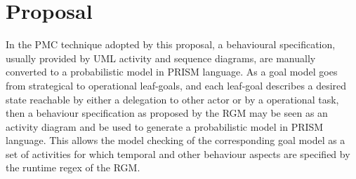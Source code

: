 \chapter{Proposal}\label{ch_proposal}

In the PMC technique adopted by this proposal, a behavioural specification, usually provided by UML activity and sequence diagrams, are manually converted to a probabilistic model in PRISM language. As a goal model goes from strategical to operational leaf-goals, and each leaf-goal describes a desired state reachable by either a delegation to other actor or by a operational task, then a behaviour specification as proposed by the RGM may be seen as an activity diagram and be used to generate a probabilistic model in PRISM language. This allows the model checking of the corresponding goal model as a set of activities for which temporal and other behaviour aspects are specified by the runtime regex of the RGM.